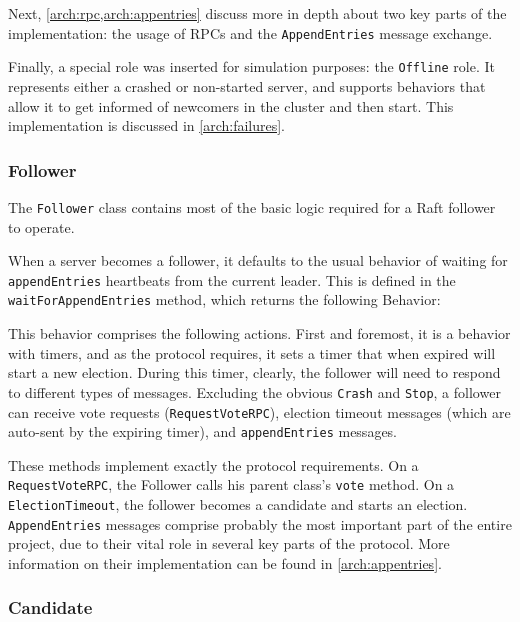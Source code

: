 Next, \cref{arch:rpc,arch:appentries} discuss more in depth about two key parts of the implementation: the usage of RPCs and the \texttt{AppendEntries} message exchange.

Finally, a special role was inserted for simulation purposes: the \texttt{Offline} role. It represents either a crashed or non-started server, and supports behaviors that allow it to get informed of newcomers in the cluster and then start. This implementation is discussed in \cref{arch:failures}.

\subsubsection{Follower}
\label{arch:follower}

The \texttt{Follower} class contains most of the basic logic required for a Raft follower to operate.


When a server becomes a follower, it defaults to the usual behavior of waiting for \texttt{appendEntries} heartbeats from the current leader. This is defined in the \texttt{waitForAppendEntries} method, which returns the following Behavior:


This behavior comprises the following actions. First and foremost, it is a behavior with timers, and as the protocol requires, it sets a timer that when expired will start a new election. During this timer, clearly, the follower will need to respond to different types of messages. Excluding the obvious \texttt{Crash} and \texttt{Stop}, a follower can receive vote requests (\texttt{RequestVoteRPC}), election timeout messages (which are auto-sent by the expiring timer), and \texttt{appendEntries} messages. 

These methods implement exactly the protocol requirements. On a \texttt{RequestVoteRPC}, the Follower calls his parent class's \texttt{vote} method. On a \texttt{ElectionTimeout}, the follower becomes a candidate and starts an election. \texttt{AppendEntries} messages comprise probably the most important part of the entire project, due to their vital role in several key parts of the protocol. More information on their implementation can be found in \cref{arch:appentries}.

\subsubsection{Candidate}
\label{arch:candidate}

